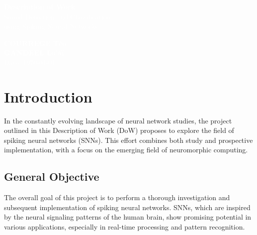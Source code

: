 \documentclass{article}
\begin{document}
\pagecolor{darkbluegrey}
\afterpage{\nopagecolor}


\begin{titlepage}
  \begin{center}
    \textcolor{white}{\textbf{\Huge Description of Work}}\\ %
    \vspace{1cm}
    \textcolor{white}{\Large Sound Detection and Classification\\using Spiking Neural Networks} %
    \vspace{3cm}
  \end{center}
  \begin{center}
    \textcolor{white}{ %
      \textbf{COURREGE Téo}\\
      \textbf{GANDEEL Lo'aï}\\
      \vspace{1cm}
      \Large Date: \today}
  \end{center}
\end{titlepage}

\newpage

\tableofcontents

\section{Introduction}

In the constantly evolving landscape of neural network studies, the project outlined in this Description of Work (DoW) proposes to explore the field of spiking neural networks (SNNs). This effort combines both study and prospective implementation, with a focus on the emerging field of neuromorphic computing.

\subsection{General Objective}

The overall goal of this project is to perform a thorough investigation and subsequent implementation of spiking neural networks. SNNs, which are inspired by the neural signaling patterns of the human brain, show promising potential in various applications, especially in real-time processing and pattern recognition.
\end{document}
